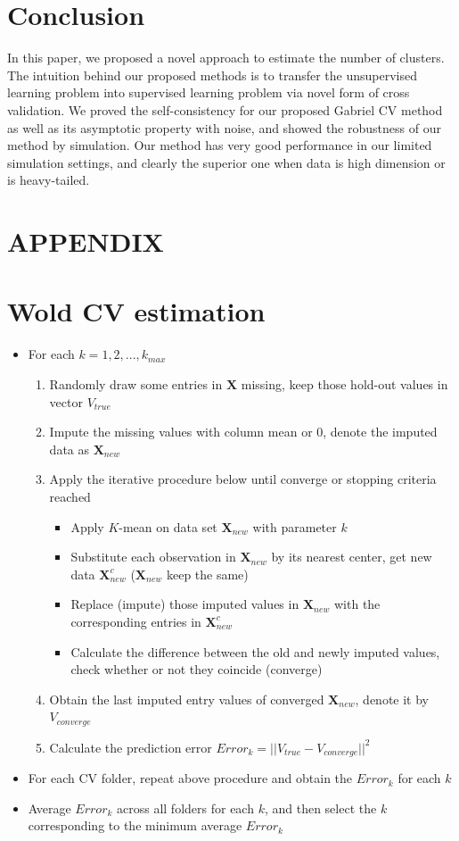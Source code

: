 \documentclass[11pt]{article}
\begin{document}
\section{Conclusion}
In this paper, we proposed a novel approach to estimate the number of clusters. The intuition behind our proposed methods is to transfer the unsupervised learning problem into supervised learning problem via novel form of cross validation. We proved the self-consistency for our proposed Gabriel CV method as well as its asymptotic property with noise, and showed the robustness of our method by simulation. Our method has very good performance in our limited simulation settings, and clearly the superior one when data is high dimension or is heavy-tailed.


\section*{\textbf{APPENDIX}}
\appendix
\section{Wold CV estimation} \label{app:foobar}
\begin{itemize}
	\item For each $k = 1,2,...,k_{max}$
	\begin{enumerate}
		\item Randomly draw some entries in $\mathbf{X}$ missing, keep those hold-out values in vector $V_{true}$
		\item Impute the missing values with column mean or $0$, denote the imputed data as $\mathbf{X}_{new}$
		\item Apply the iterative procedure below until converge or stopping criteria reached
		\begin{itemize}
			\item Apply $K$-mean on data set $\mathbf{X}_{new}$ with parameter $k$
			\item Substitute each observation in $\mathbf{X}_{new}$ by its nearest center, get new data $\mathbf{X}^c_{new}$ ($\mathbf{X}_{new}$ keep the same)
			\item Replace (impute) those imputed values in $\mathbf{X}_{new}$ with the corresponding entries in $\mathbf{X}^c_{new}$
			\item Calculate the difference between the old and newly imputed values, check whether or not they coincide (converge) 
		\end{itemize}
		\item Obtain the last imputed entry values of converged $\mathbf{X}_{new}$, denote it by $V_{converge}$
		\item Calculate the prediction error  $Error_k = ||V_{true} - V_{converge}||^2$ 
	\end{enumerate}
	\item For each CV folder, repeat above procedure and obtain the $Error_k$ for each $k$
	\item Average $Error_k$ across all folders for each $k$, and then select the $k$ corresponding to the minimum average $Error_k$ 
\end{itemize}



\end{document}
